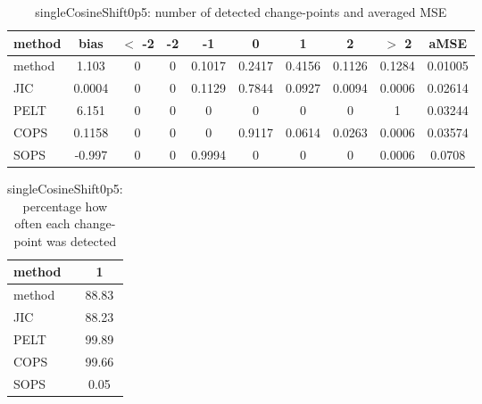 \begin{table}[ht]
\centering
\begin{tabular}{l|c|ccccccc|c}
  \hline
method & bias & $<$ -2 & -2 & -1 & 0 & 1 & 2 & $>$ 2 & aMSE \\ 
  \hline
method & 1.103 &     0 &     0 & 0.1017 & 0.2417 & 0.4156 & 0.1126 & 0.1284 & 0.01005 \\ 
  JIC & 0.0004 &     0 &     0 & 0.1129 & 0.7844 & 0.0927 & 0.0094 & 0.0006 & 0.02614 \\ 
  PELT & 6.151 &     0 &     0 &     0 &     0 &     0 &     0 &     1 & 0.03244 \\ 
  COPS & 0.1158 &     0 &     0 &     0 & 0.9117 & 0.0614 & 0.0263 & 0.0006 & 0.03574 \\ 
  SOPS & -0.997 &     0 &     0 & 0.9994 &     0 &     0 &     0 & 0.0006 & 0.0708 \\ 
   \hline
\end{tabular}
\caption{singleCosineShift0p5: number of detected change-points and averaged MSE} 
\label{tab:singleCosineShift0p5Njumps}
\end{table}
\begin{table}[ht]
\centering
\begin{tabular}{l|c}
  \hline
method & 1 \\ 
  \hline
method &  88.83 \\ 
  JIC &  88.23 \\ 
  PELT &  99.89 \\ 
  COPS &  99.66 \\ 
  SOPS &   0.05 \\ 
   \hline
\end{tabular}
\caption{singleCosineShift0p5: percentage how often each change-point was detected} 
\label{tab:singleCosineShift0p5Detections}
\end{table}
